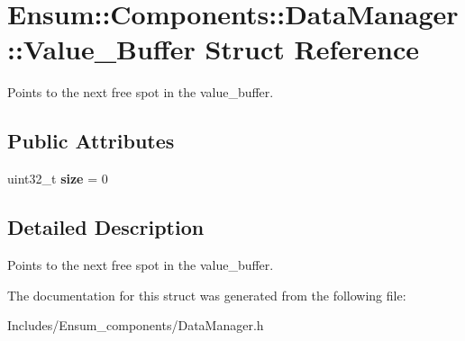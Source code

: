 \hypertarget{struct_ensum_1_1_components_1_1_data_manager_1_1_value___buffer}{}\section{Ensum\+:\+:Components\+:\+:Data\+Manager\+:\+:Value\+\_\+\+Buffer Struct Reference}
\label{struct_ensum_1_1_components_1_1_data_manager_1_1_value___buffer}


Points to the next free spot in the value\+\_\+buffer.  


\subsection*{Public Attributes}
\begin{DoxyCompactItemize}
\item 
uint32\+\_\+t {\bfseries size} = 0\hypertarget{struct_ensum_1_1_components_1_1_data_manager_1_1_value___buffer_afa7fce9c106f7989467de0f759127080}{}\label{struct_ensum_1_1_components_1_1_data_manager_1_1_value___buffer_afa7fce9c106f7989467de0f759127080}

\end{DoxyCompactItemize}


\subsection{Detailed Description}
Points to the next free spot in the value\+\_\+buffer. 

The documentation for this struct was generated from the following file\+:\begin{DoxyCompactItemize}
\item 
Includes/\+Ensum\+\_\+components/Data\+Manager.\+h\end{DoxyCompactItemize}
